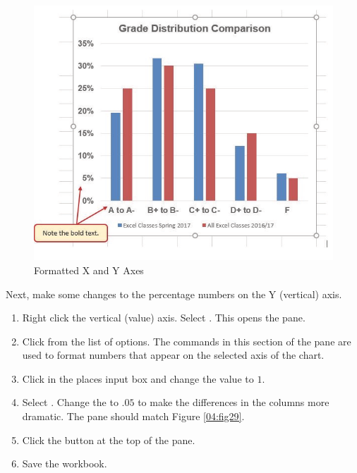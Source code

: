 \begin{figure}[H]
	\centering
	\includegraphics[width=\maxwidth{.95\linewidth}]{gfx/ch04_fig28}
	\caption{Formatted X and Y Axes}
	\label{04:fig28}
\end{figure}

Next, make some changes to the percentage numbers on the Y (vertical) axis.

\begin{enumerate}
	\item Right click the vertical (value) axis. Select . This opens the  pane.
	\item Click  from the list of options. The commands in this section of the  pane are used to format numbers that appear on the selected axis of the chart.
	\item Click in the  places input box and change the value to $ 1 $.
	\item Select . Change the  to $ .05 $ to make the differences in the columns more dramatic. The  pane should match Figure \ref{04:fig29}.
	\item Click the  button at the top of the  pane.
	\item Save the workbook.
\end{enumerate}

